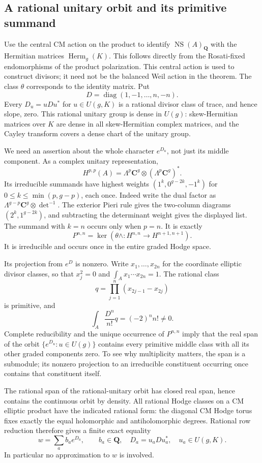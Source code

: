 \subsection{A rational unitary orbit and its primitive summand}

Use the central CM action on the product to identify
$\operatorname{NS}(A)_{\mathbf Q}$ with the Hermitian matrices
$\operatorname{Herm}_g(K)$.  This follows directly from the
Rosati-fixed endomorphisms of the product polarization.
This central action is used to construct divisors; it need not be
the balanced Weil action in the theorem.  The class $\theta$
corresponds to the identity matrix.  Put
\[
 D=\operatorname{diag}(1,-1,\ldots,n,-n).
\]
Every $D_u=uDu^*$ for $u\in U(g,K)$ is a rational divisor class
of trace, and hence slope, zero.  This rational unitary group is
dense in $U(g)$: skew-Hermitian matrices over $K$ are dense in all
skew-Hermitian complex matrices, and the Cayley transform covers
a dense chart of the unitary group.

We need an assertion about the whole character $e^{D_u}$, not just
its middle component.  As a complex unitary representation,
\[
 H^{p,p}(A)=\Lambda^p\mathbf C^g\otimes
                         (\Lambda^p\mathbf C^g)^*.
\]
Its irreducible summands have highest weights
$(1^k,0^{g-2k},-1^k)$ for $0\le k\le\min(p,g-p)$, each once.
Indeed write the dual factor as
$\Lambda^{g-p}\mathbf C^g\otimes\det^{-1}$.
The exterior Pieri rule gives the two-column diagrams
$(2^k,1^{g-2k})$, and subtracting the determinant weight gives
the displayed list.  The summand with $k=n$ occurs only when
$p=n$.  It is exactly
\[
 P^{n,n}=\ker(\theta\wedge:H^{n,n}\longrightarrow H^{n+1,n+1}).
\]
It is irreducible and occurs once in the entire graded Hodge space.

Its projection from $e^D$ is nonzero.  Write $x_1,\ldots,x_{2n}$
for the coordinate elliptic divisor classes, so that $x_j^2=0$ and
$\int_Ax_1\cdots x_{2n}=1$.  The rational class
\[
 q=\prod_{j=1}^n(x_{2j-1}-x_{2j})
\]
is primitive, and
\[
 \int_A\frac{D^n}{n!}q=(-2)^n n!\ne0.
\]
Complete reducibility and the unique occurrence of $P^{n,n}$ imply
that the real span of the orbit $\{e^{D_u}:u\in U(g)\}$ contains
every primitive middle class with all its other graded components
zero.  To see why multiplicity matters, the span is a submodule;
its nonzero projection to an irreducible constituent occurring once
contains that constituent itself.

The rational span of the rational-unitary orbit has closed real
span, hence contains the continuous orbit by density.  All rational
Hodge classes on a CM elliptic product have the indicated rational
form: the diagonal CM Hodge torus fixes exactly the equal
holomorphic and antiholomorphic degrees.  Rational row reduction
therefore gives a finite exact equality
\begin{equation}
 w=\sum_a b_a e^{D_a},\qquad b_a\in\mathbf Q,
 \quad D_a=u_aDu_a^*,\quad u_a\in U(g,K).
 \label{eq:primitive-orbit-relation}
\end{equation}
In particular no approximation to $w$ is involved.

